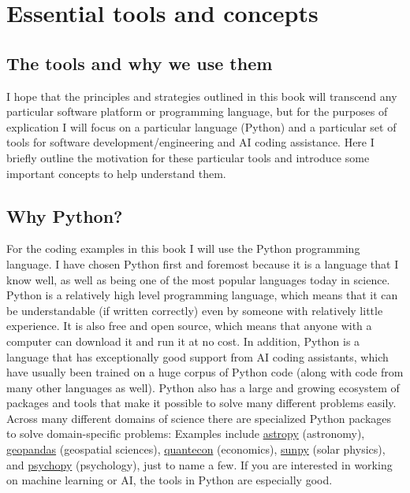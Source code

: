 \chapter{Essential tools and concepts}

\section{The tools and why we use them}

I hope that the principles and strategies outlined in this book will transcend any particular software platform or programming language, but for the purposes of explication I will focus on a particular language (Python) and a particular set of tools for software development/engineering and AI coding assistance.
Here I briefly outline the motivation for these particular tools and introduce some important concepts to help understand them.

\section{Why Python?}

For the coding examples in this book I will use the Python programming language.
I have chosen Python first and foremost because it is a language that I know well, as well as being one of the most popular languages today in science.
Python is a relatively high level programming language, which means that it can be understandable (if written correctly) even by someone with relatively little experience.
It is also free and open source, which means that anyone with a computer can download it and run it at no cost.
In addition, Python is a language that has exceptionally good support from AI coding assistants, which have usually been trained on a huge corpus of Python code (along with code from many other languages as well).
Python also has a large and growing ecosystem of packages and tools that make it possible to solve many different problems easily.
Across many different domains of science there are specialized Python packages to solve domain-specific problems: Examples include \href{https://www.astropy.org/}{astropy} (astronomy), \href{https://geopandas.org/en/stable/getting\_started/introduction.html}{geopandas} (geospatial sciences), \href{https://quantecon.org/}{quantecon} (economics), \href{https://sunpy.org/}{sunpy} (solar physics), and \href{https://www.psychopy.org/}{psychopy} (psychology), just to name a few.
If you are interested in working on machine learning or AI, the tools in Python are especially good.


